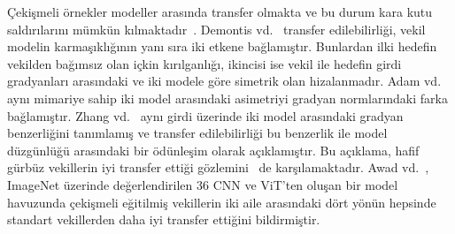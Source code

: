 Çekişmeli örnekler modeller arasında transfer olmakta ve bu durum kara kutu saldırılarını mümkün kılmaktadır~\cite{papernot2016transferability}. Demontis vd.~\cite{demontis2019adversarial} transfer edilebilirliği, vekil modelin karmaşıklığının yanı sıra iki etkene bağlamıştır. Bunlardan ilki hedefin vekilden bağımsız olan içkin kırılganlığı, ikincisi ise vekil ile hedefin girdi gradyanları arasındaki ve iki modele göre simetrik olan hizalanmadır. Adam vd.~\cite{adam2019reducing} aynı mimariye sahip iki model arasındaki asimetriyi gradyan normlarındaki farka bağlamıştır. Zhang vd.~\cite{zhang2024why} aynı girdi üzerinde iki model arasındaki gradyan benzerliğini tanımlamış ve transfer edilebilirliği bu benzerlik ile model düzgünlüğü arasındaki bir ödünleşim olarak açıklamıştır. Bu açıklama, hafif gürbüz vekillerin iyi transfer ettiği gözlemini~\cite{springer2021little} de karşılamaktadır. Awad vd.~\cite{awad2025defense}, ImageNet üzerinde değerlendirilen 36 CNN ve ViT'ten oluşan bir model havuzunda çekişmeli eğitilmiş vekillerin iki aile arasındaki dört yönün hepsinde standart vekillerden daha iyi transfer ettiğini bildirmiştir.

